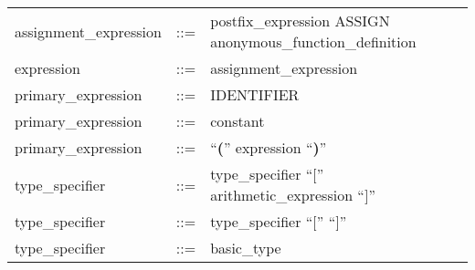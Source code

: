 \documentclass[11pt]{article}
\begin{document}
\begin{longtable}{lrl}
assignment\_expression                     & ::= &
  \begin{minipage}[t]{\rulerhs}
    \raggedright
    postfix\_expression ASSIGN anonymous\_function\_definition
  \end{minipage}                                                             \\
expression                                 & ::= &
  \begin{minipage}[t]{\rulerhs}
    \raggedright
    assignment\_expression
  \end{minipage}                                                             \\
primary\_expression                        & ::= &
  \begin{minipage}[t]{\rulerhs}
    \raggedright
    IDENTIFIER
  \end{minipage}                                                             \\
primary\_expression                        & ::= &
  \begin{minipage}[t]{\rulerhs}
    \raggedright
    constant
  \end{minipage}                                                             \\
primary\_expression                        & ::= &
  \begin{minipage}[t]{\rulerhs}
    \raggedright
    ``{\bf (}'' expression ``{\bf )}''
  \end{minipage}                                                             \\
type\_specifier                            & ::= &
  \begin{minipage}[t]{\rulerhs}
    \raggedright
    type\_specifier ``{\bf $[$}'' arithmetic\_expression ``{\bf $]$}''
  \end{minipage}                                                             \\
type\_specifier                            & ::= &
  \begin{minipage}[t]{\rulerhs}
    \raggedright
    type\_specifier ``{\bf $[$}'' ``{\bf $]$}''
  \end{minipage}                                                             \\
type\_specifier                            & ::= &
  \begin{minipage}[t]{\rulerhs}
    \raggedright
    basic\_type
  \end{minipage}                                                             \\

\end{longtable}
\end{document}
